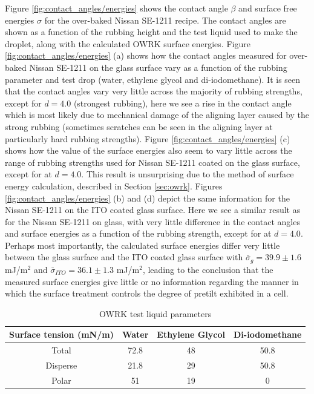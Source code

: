 Figure \ref{fig:contact_angles/energies} shows the contact angle $\beta$ and surface free energies $\sigma$ for the over-baked Nissan SE-1211 recipe. The contact angles are shown as a function of the rubbing height and the test liquid used to make the droplet, along with the calculated OWRK surface energies. Figure \ref{fig:contact_angles/energies} (a) shows how the contact angles measured for over-baked Nissan SE-1211 on the glass surface vary as a function of the rubbing parameter and test drop (water, ethylene glycol and di-iodomethane). It is seen that the contact angles vary very little across the majority of rubbing strengths, except for $d=4.0$ (strongest rubbing), here we see a rise in the contact angle which is most likely due to mechanical damage of the aligning layer caused by the strong rubbing (sometimes scratches can be seen in the aligning layer at particularly hard rubbing strengths). Figure \ref{fig:contact_angles/energies} (c) shows how the value of the surface energies also seem to vary little across the range of rubbing strengths used for Nissan SE-1211 coated on the glass surface, except for at $d=4.0$. This result is unsurprising due to the method of surface energy calculation, described in Section \ref{sec:owrk}. Figures \ref{fig:contact_angles/energies} (b) and (d) depict the same information for the Nissan SE-1211 on the ITO coated glass surface. Here we see a similar result as for the Nissan SE-1211 on glass, with very little difference in the contact angles and surface energies as a function of the rubbing strength, except for at $d=4.0$. Perhaps most importantly, the calculated surface energies differ very little between the glass surface and the ITO coated glass surface with $\bar{\sigma}_{g}=39.9 \pm 1.6$ mJ/m$^2$ and $\bar{\sigma}_{ITO}=36.1\pm1.3$ mJ/m$^2$, leading to the conclusion that the measured surface energies give little or no information regarding the manner in which the surface treatment controls the degree of pretilt exhibited in a cell.


\begin{table}[ht]
\centering  %
\begin{tabular}{c c c c} 
\hline\hline                       
Surface tension (mN/m)	&Water 	&Ethylene Glycol		&Di-iodomethane\\
\hline                  
Total					& 72.8	& 48				& 50.8\\
Disperse				& 21.8	& 29				& 50.8\\
Polar					& 51	  	& 19				& 0\\ 
\hline
\end{tabular}
\caption{OWRK test liquid parameters} 
\label{tab:owrk}
\end{table}



